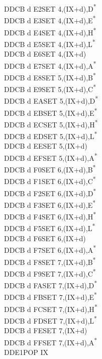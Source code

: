 \documentclass[twoside,openright,a4paper]{book}
\begin{document}
\begin{multicols}{3}
{\begin{tabbing}
	DDCB d E2\>SET 4,(IX+d),D\textsuperscript{*}\\
	DDCB d E3\>SET 4,(IX+d),E\textsuperscript{*}\\
	DDCB d E4\>SET 4,(IX+d),H\textsuperscript{*}\\
	DDCB d E5\>SET 4,(IX+d),L\textsuperscript{*}\\
	DDCB d E6\>SET 4,(IX+d)\\
	DDCB d E7\>SET 4,(IX+d),A\textsuperscript{*}\\
	DDCB d E8\>SET 5,(IX+d),B\textsuperscript{*}\\
	DDCB d E9\>SET 5,(IX+d),C\textsuperscript{*}\\
	DDCB d EA\>SET 5,(IX+d),D\textsuperscript{*}\\
	DDCB d EB\>SET 5,(IX+d),E\textsuperscript{*}\\
	DDCB d EC\>SET 5,(IX+d),H\textsuperscript{*}\\
	DDCB d ED\>SET 5,(IX+d),L\textsuperscript{*}\\
	DDCB d EE\>SET 5,(IX+d)\\
	DDCB d EF\>SET 5,(IX+d),A\textsuperscript{*}\\
	DDCB d F0\>SET 6,(IX+d),B\textsuperscript{*}\\
	DDCB d F1\>SET 6,(IX+d),C\textsuperscript{*}\\
	DDCB d F2\>SET 6,(IX+d),D\textsuperscript{*}\\
	DDCB d F3\>SET 6,(IX+d),E\textsuperscript{*}\\
	DDCB d F4\>SET 6,(IX+d),H\textsuperscript{*}\\
	DDCB d F5\>SET 6,(IX+d),L\textsuperscript{*}\\
	DDCB d F6\>SET 6,(IX+d)\\
	DDCB d F7\>SET 6,(IX+d),A\textsuperscript{*}\\
	DDCB d F8\>SET 7,(IX+d),B\textsuperscript{*}\\
	DDCB d F9\>SET 7,(IX+d),C\textsuperscript{*}\\
	DDCB d FA\>SET 7,(IX+d),D\textsuperscript{*}\\
	DDCB d FB\>SET 7,(IX+d),E\textsuperscript{*}\\
	DDCB d FC\>SET 7,(IX+d),H\textsuperscript{*}\\
	DDCB d FD\>SET 7,(IX+d),L\textsuperscript{*}\\
	DDCB d FE\>SET 7,(IX+d)\\
	DDCB d FF\>SET 7,(IX+d),A\textsuperscript{*}\\
	DDE1\>POP IX\\

\end{tabbing}}
\end{multicols}
\end{document}
